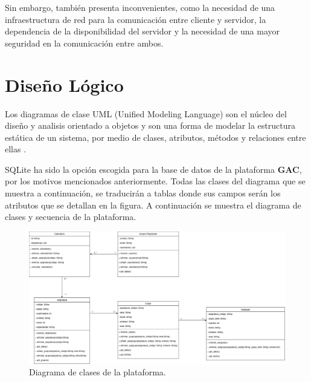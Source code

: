 Sin embargo, también presenta inconvenientes, como la necesidad de una infraestructura de red para la comunicación entre cliente y servidor, la dependencia de la disponibilidad del servidor y la necesidad de una mayor seguridad en la comunicación entre ambos.\newline

\section{Diseño Lógico}

Los diagramas de clase UML (Unified Modeling Language) son el núcleo del diseño y analisis orientado a objetos y son una forma de modelar la estructura estática de un sistema, por medio de clases, atributos, métodos y relaciones entre ellas \cite{herchi2012user}.\newline

SQLite ha sido la opción escogida para la base de datos de la plataforma \textbf{GAC}, por los motivos mencionados anteriormente. Todas las clases del diagrama que se muestra a continuación, se traducirán a tablas donde sus campos serán los atributos que se detallan en la figura. A continuación se muestra el diagrama de clases y secuencia de la plataforma.\newline

\begin{figure}[H]
    \centering
    \includegraphics[width=1\textwidth]{./imagenes/Class_Diagram.png}
    \caption{Diagrama de clases de la plataforma.}
\end{figure}

